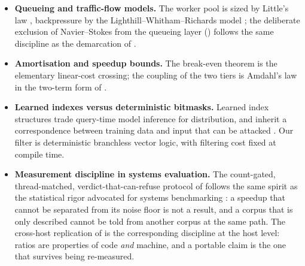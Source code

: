 \documentclass[11pt,letterpaper]{article}
\begin{document}
\begin{itemize}[leftmargin=*,itemsep=1pt]
column-labelling hazard that can make the same measurements appear to
contradict the law.
\item \textbf{Queueing and traffic-flow models.} The worker pool is sized
by Little's law \cite{little1961}, backpressure by the
Lighthill--Whitham--Richards model \cite{lwr1955,richards1956}; the
deliberate exclusion of Navier--Stokes from the queueing layer
() follows the same discipline as the demarcation of
.
\item \textbf{Amortisation and speedup bounds.} The break-even theorem is
the elementary linear-cost crossing; the coupling of the two tiers is
Amdahl's law \cite{amdahl1967} in the two-term form of
.
\item \textbf{Learned indexes versus deterministic bitmasks.} Learned index
structures \cite{kraska2018case, mitzenmacher2018learned, deeds2020stacked}
trade query-time model inference for distribution, and inherit a
correspondence between training data and input that can be attacked
\cite{sato2026evaluating}. Our filter is deterministic branchless vector
logic, with filtering cost fixed at compile time.
\item \textbf{Measurement discipline in systems evaluation.} The
count-gated, thread-matched, verdict-that-can-refuse protocol of
 follows the same spirit as the statistical rigor advocated
for systems benchmarking \cite{mytkowicz2009}: a speedup that cannot be separated from its
noise floor is not a result, and a corpus that is only described cannot be
told from another corpus at the same path. The cross-host replication of
 is the corresponding discipline at the host level:
ratios are properties of code \emph{and} machine, and a portable claim is
the one that survives being re-measured.
\end{itemize}
\end{document}
